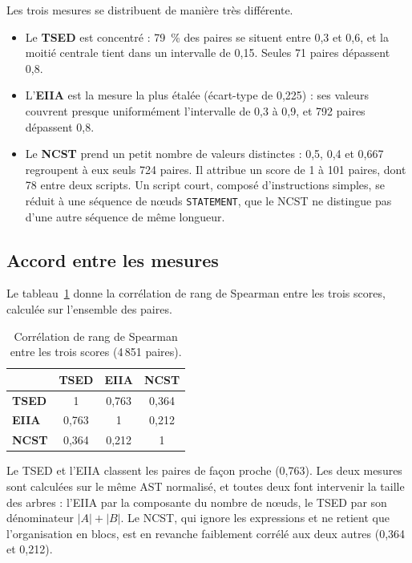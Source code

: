 \documentclass[12pt,a4paper,oneside]{report}
\begin{document}
Les trois mesures se distribuent de manière très différente.
\begin{itemize}
  \item Le \textcolor{tsedcol}{\textbf{TSED}} est concentré : 79~\% des
        paires se situent entre 0,3 et 0,6, et la moitié centrale tient dans
        un intervalle de 0,15. Seules 71 paires dépassent 0,8.
  \item L'\textcolor{eiiacol}{\textbf{EIIA}} est la mesure la plus étalée
        (écart-type de 0,225) : ses valeurs couvrent presque uniformément
        l'intervalle de 0,3 à 0,9, et 792 paires dépassent 0,8.
  \item Le \textcolor{ncstcol}{\textbf{NCST}} prend un petit nombre de valeurs
        distinctes : 0,5, 0,4 et 0,667 regroupent à eux seuls 724 paires. Il attribue un score de 1 à
        101 paires, dont 78 entre deux scripts. Un script court, composé
        d'instructions simples, se réduit à une séquence de nœuds
        \texttt{STATEMENT}, que le NCST ne distingue pas d'une autre séquence
        de même longueur.
\end{itemize}

\subsection{Accord entre les mesures}

Le tableau~\ref{tab:spearman_corpus} donne la corrélation de rang de Spearman
entre les trois scores, calculée sur l'ensemble des paires.

\begin{table}[htbp]
\centering
\small
\renewcommand{\arraystretch}{1.15}
\begin{tabular}{lccc}
\toprule
 & \textcolor{tsedcol}{\textbf{TSED}} & \textcolor{eiiacol}{\textbf{EIIA}} &
 \textcolor{ncstcol}{\textbf{NCST}} \\
\midrule
\textcolor{tsedcol}{\textbf{TSED}} & 1 & 0,763 & 0,364 \\
\textcolor{eiiacol}{\textbf{EIIA}} & 0,763 & 1 & 0,212 \\
\textcolor{ncstcol}{\textbf{NCST}} & 0,364 & 0,212 & 1 \\
\bottomrule
\end{tabular}
\caption{Corrélation de rang de Spearman entre les trois scores
(4\,851 paires).}
\label{tab:spearman_corpus}
\end{table}

Le TSED et l'EIIA classent les paires de façon proche (0,763). Les deux
mesures sont calculées sur le même AST normalisé, et toutes deux font
intervenir la taille des arbres : l'EIIA par la composante du nombre de
nœuds, le TSED par son dénominateur $|A| + |B|$. Le NCST, qui ignore les
expressions et ne retient que l'organisation en blocs, est en revanche
faiblement corrélé aux deux autres (0,364 et 0,212).
\end{document}
